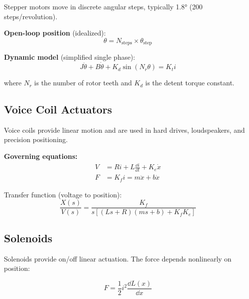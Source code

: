 Stepper motors move in discrete angular steps, typically 1.8° (200 steps/revolution).

\textbf{Open-loop position} (idealized):
\begin{equation}
\theta = N_{\text{steps}} \times \theta_{\text{step}}
\end{equation}

\textbf{Dynamic model} (simplified single phase):
\begin{equation}
J\ddot{\theta} + B\dot{\theta} + K_d\sin(N_r\theta) = K_t i
\end{equation}

where $N_r$ is the number of rotor teeth and $K_d$ is the detent torque constant.

\subsection{Voice Coil Actuators}
\label{subsec:voice_coil}

Voice coils provide linear motion and are used in hard drives, loudspeakers, and precision positioning.



\textbf{Governing equations:}
\begin{align}
V &= Ri + L\frac{\dd i}{\dd t} + K_e\dot{x} \\
F &= K_f i = m\ddot{x} + b\dot{x}
\end{align}

Transfer function (voltage to position):
\begin{equation}
\frac{X(s)}{V(s)} = \frac{K_f}{s[(Ls + R)(ms + b) + K_f K_e]}
\end{equation}

\subsection{Solenoids}
\label{subsec:solenoids}

Solenoids provide on/off linear actuation. The force depends nonlinearly on position:

\begin{equation}
F = \frac{1}{2}i^2\frac{\dd L(x)}{\dd x}
\end{equation}

